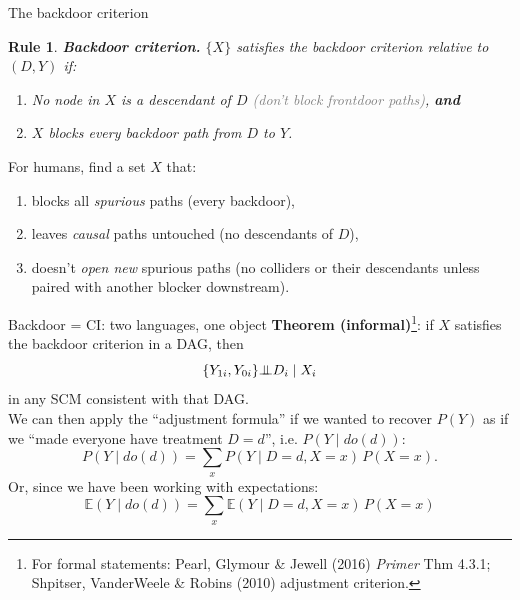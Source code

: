 \documentclass[xcolor=dvipsnames]{beamer}
\newtheorem{arule}{Rule}
\newcommand\E{\mathbb{E}}
\newcommand{\indep}{{\bot\negthickspace\negthickspace\bot}}
\begin{document}
\begin{frame}{The backdoor criterion}
\small
{}
\begin{arule}
\textbf{Backdoor criterion.} $\{X\}$ satisfies the backdoor criterion relative to $(D, Y)$ if:
\begin{enumerate}
\footnotesize
\item No node in $X$ is a descendant of $D$ \textcolor{gray}{(don't block frontdoor paths)}, \textbf{and}
\item $X$ blocks every backdoor path from $D$ to $Y$.
\end{enumerate}
\end{arule}

\bigskip
{} For humans, find a set $X$ that:
\begin{enumerate}
\footnotesize
\item<2-> blocks all \textit{spurious} paths (every backdoor),
\item<3-> leaves \textit{causal} paths untouched (no descendants of $D$),
\item<4-> doesn't \textit{open new} spurious paths (no colliders or their descendants unless paired with another blocker downstream).
\end{enumerate}
\end{frame}


\begin{frame}{Backdoor = CI: two languages, one object}
\small
{} \textbf{Theorem (informal)}\footnote{For formal statements: Pearl, Glymour \& Jewell (2016) \textit{Primer} Thm 4.3.1; Shpitser, VanderWeele \& Robins (2010) adjustment criterion.}: if $X$ satisfies the backdoor criterion in a DAG, then
$$\{Y_{1i}, Y_{0i}\} \indep D_i \mid X_i$$
in any SCM consistent with that DAG.\\[4pt]

 We can then apply the ``adjustment formula'' if we wanted to recover $P(Y)$ as if we ``made everyone have treatment $D=d$'', i.e. $P(Y \mid do(d))$:
$$P(Y \mid do(d)) = \sum_x P(Y \mid D\!=\!d, X\!=\!x)\,P(X\!=\!x).$$
Or, since we have been working with expectations:
$$\E(Y \mid do(d)) = \sum_x \E(Y \mid D\!=\!d, X\!=\!x)\,P(X\!=\!x)$$
\end{frame}
\end{document}
